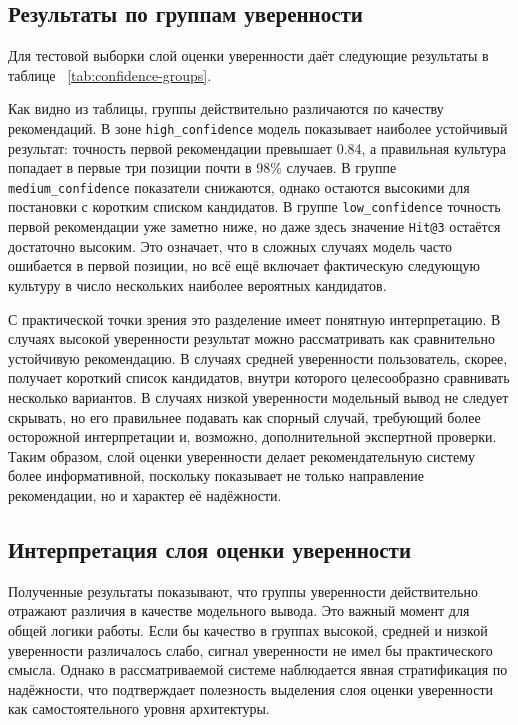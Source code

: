\subsection{Результаты по группам уверенности}

Для тестовой выборки слой оценки уверенности даёт следующие результаты в таблице ~\ref{tab:confidence-groups}.



Как видно из таблицы, группы действительно различаются по качеству рекомендаций. В зоне \texttt{high\_confidence}
модель показывает наиболее устойчивый результат: точность первой рекомендации превышает 0.84, а правильная культура
попадает в первые три позиции почти в 98\% случаев. В группе \texttt{medium\_confidence} показатели снижаются, однако
остаются высокими для постановки с коротким списком кандидатов. В группе \texttt{low\_confidence} точность первой
рекомендации уже заметно ниже, но даже здесь значение
\texttt{Hit@3} остаётся достаточно высоким. Это означает, что в сложных случаях модель часто ошибается в первой позиции,
но всё ещё включает фактическую следующую культуру в число нескольких наиболее вероятных кандидатов.

С практической точки зрения это разделение имеет понятную интерпретацию. В случаях высокой уверенности результат можно
рассматривать как сравнительно устойчивую рекомендацию. В случаях средней уверенности пользователь, скорее, получает
короткий список кандидатов, внутри которого целесообразно сравнивать несколько вариантов. В случаях низкой уверенности
модельный вывод не следует скрывать, но его правильнее подавать как спорный случай, требующий более осторожной
интерпретации и, возможно, дополнительной экспертной проверки. Таким образом, слой оценки уверенности делает
рекомендательную систему более информативной, поскольку показывает не только направление рекомендации, но и характер её
надёжности.

\subsection{Интерпретация слоя оценки уверенности}

Полученные результаты показывают, что группы уверенности действительно отражают различия в качестве модельного вывода.
Это важный момент для общей логики работы. Если бы качество в группах
высокой, средней и низкой уверенности различалось слабо, сигнал уверенности не имел бы практического смысла.
Однако в рассматриваемой системе наблюдается явная стратификация по надёжности, что подтверждает полезность выделения
слоя оценки уверенности как самостоятельного уровня архитектуры.

